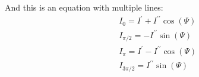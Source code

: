 And this is an equation with multiple lines:
\begin{equation}
\begin{aligned}
&I_{0}=I^{\prime}+I^{\prime\prime}\cos(\varPsi)   \\
&I_{\pi/2}=-I^{\prime\prime}\sin(\varPsi)                \\
&I_{\pi}=I^{\prime}-I^{\prime\prime}\cos(\varPsi)   \\
&I_{3\pi/2}=I^{\prime\prime}\sin(\varPsi)
\end{aligned}
\end{equation}

